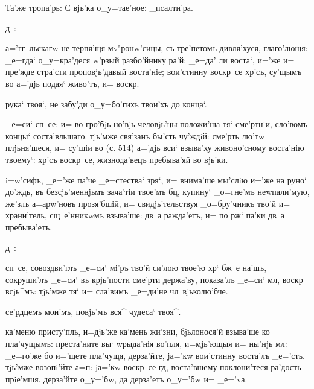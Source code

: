 
Та'же тропа'рь: С%
вjь'ка о_у=тае'ное: %
_псалти'ра.%

д~:%

а='гг~льскагw не терпя'щя мv"ронw'сицы, съ тре'петомъ 
дивля'хуся, глаго'лющя: _е=гда` о_у=кра'деся w'рзый 
разбо'йнику ра'й; _е=да' ли воста`, и='же и= пре'жде 
стра'сти проповjь'давый воста'нiе; вои'стинну воскр~се 
хр'съ, су'щымъ во а='дjь подая` живо'тъ, и= 
воскр.

рука` твоя`, не забу'ди о_у=бо'гихъ твои'хъ до конца`.

_е=си` сп~се: и= во гро'бjь но'вjь человjь'цы положи'ша 
тя` сме'ртнiи, сло'вомъ концы` соста'вльшаго. тjь'мже 
свя'занъ бы'сть чу'ждiй: сме'рть лю'тw плjьня'шеся, и= 
су'щiи во (с. 514) а='дjь вси` взыва'ху живоно'сному 
воста'нiю твоему`: хр'съ воскр~се, жизнода'вецъ 
пребыва'яй во вjь'ки.

i=w'сифъ, _е='же па'че _е=стества` зря`, и= внима'ше 
мы'слiю и='же на руно` до'ждь, въ безсjь'меннjьмъ 
зача'тiи твое'мъ бц, купину` _о=гне'мъ неwпали'мую, 
же'злъ а=арw'новъ прозя'бшiй, и= свидjь'тельствуя 
_о=бру'чникъ тво'й и= храни'тель, сщ~е'нникwмъ взыва'ше: 
дв~а ражда'етъ, и= по рж` па'ки дв~а пребыва'етъ.

д~:%


сп~се, совоздви'глъ _е=си` мi'ръ тво'й си'лою твое'ю 
хр` бж~е на'шъ, сокруши'лъ _е=си` въ крjь'пости 
сме'рти держа'ву, показа'лъ _е=си` мл, воскр 
всjь^мъ: тjь'мже тя` и= сла'вимъ _е=ди'не чл~вjьколю'бче.

се'рдцемъ мои'мъ, повjь'мъ вся^ чудеса` твоя^.

ка'меню присту'пль, и=дjь'же ка'мень жи'зни, бjьлонося'й 
взыва'ше ко пла'чущымъ: преста'ните вы` w\т рыда'нiя 
во'пля, и=мjь'ющыя и= ны'нjь мл: _е=го'же бо 
и='щете пла'чущя, дерза'йте, jа='кw вои'стинну воста'лъ 
_е='сть. тjь'мже возопi'йте а=п: jа='кw воскр~се 
гд, воста'вшему поклони'теся ра'дость прiе'мшя. 
дерза'йте о_у='бw, да дерза'етъ о_у='бw и= _е='vа.

